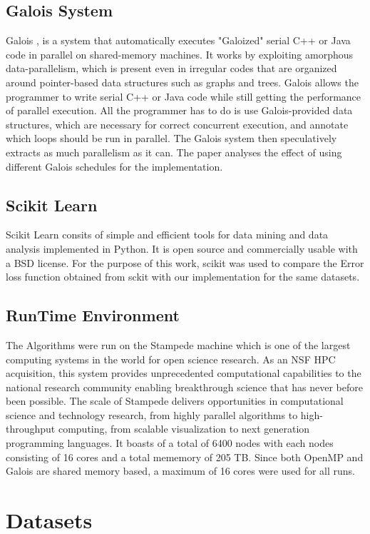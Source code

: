 \documentclass{sigplanconf}
\begin{document}
\subsection{Galois System}
Galois \cite{galois1}, \cite{galois2} is a system that automatically executes "Galoized" serial C++ or Java code in parallel on shared-memory machines. It works by exploiting amorphous data-parallelism, which is present even in irregular codes that are organized around pointer-based data structures such as graphs and trees. Galois allows the programmer to write serial C++ or Java code while still getting the performance of parallel execution. All the programmer has to do is use Galois-provided data structures, which are necessary for correct concurrent execution, and annotate which loops should be run in parallel. The Galois system then speculatively extracts as much parallelism as it can. The paper analyses the effect of using different Galois schedules for the implementation. 

\subsection{Scikit Learn}
Scikit Learn \cite{scikit} consits of simple and efficient tools for data mining and data analysis implemented in Python. It is open source and commercially usable with a BSD license. For the purpose of this work, scikit was used to compare the Error loss function obtained from sckit with our implementation for the same datasets.

\subsection{RunTime Environment}
The Algorithms were run on the Stampede machine which is one of the largest computing systems in the world for open science research. As an NSF HPC acquisition, this system provides unprecedented computational capabilities to the national research community enabling breakthrough science that has never before been possible. The scale of Stampede delivers opportunities in computational science and technology research, from highly parallel algorithms to high-throughput computing, from scalable visualization to next generation programming languages. It boasts of a total of 6400 nodes with each nodes consisting of 16 cores and a total mememory of 205 TB. Since both OpenMP and Galois are shared memory based, a maximum of 16 cores were used for all runs.

\section{Datasets}
\end{document}
